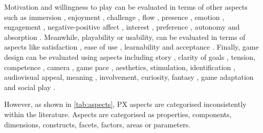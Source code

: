 Motivation and willingness to play can be evaluated in terms of other aspects such as immersion \autocite{Lapas2015,Nacke2009,VandenAbeele2016,Wiemeyer2016,Nijhar2012,Sanchez2009,Desurvire2009,Nijholt2008}, enjoyment \autocite{Ho2017,Li2016,VandenAbeele2016,Zhao2016,Li2006,Berkovsky2010}, challenge \autocite{Moosajee,Nacke2009,VandenAbeele2016,Wiemeyer2016,Desurvire2009}, flow \autocite{Lapas2015,Bernhaupt2015,Nacke2009,Wiemeyer2016,Nijholt2008}, presence \autocite{Lapas2015,Mader2012,Ho2017,Wiemeyer2016}, 
emotion \autocite{Bernhaupt2015,Sanchez2009,Wiemeyer2016}, engagement \autocite{Yanez-Gomez2017,Wiemeyer2016}, negative-positive affect \autocite{Nacke2009}, interest \autocite{VandenAbeele2016}, preference \autocite{Zhao2016}, autonomy \autocite{Wiemeyer2016,VandenAbeele2016} and 
absorption \autocite{Lapas2015}. Meanwhile, playability or usability, can be evaluated in terms of aspects like satisfaction \autocite{Yanez-Gomez2017,Zhao2016,Sanchez2009}, ease of use \autocite{Moosajee,VandenAbeele2016,Cameirao2010}, learnability \autocite{GonzalezSanchez2009,Desurvire2009} and
acceptance \autocite{Yanez-Gomez2017}. Finally, game design can be evaluated using aspects including story \autocite{Moosajee,Desurvire2009}, clarity of goals \autocite{VandenAbeele2016,Desurvire2009}, tension, competence \autocite{Wiemeyer2016,Nacke2009}, camera \autocite{Moosajee},
game pace \autocite{Moosajee,Desurvire2009}, aesthetics, stimulation, identification \autocite{Bernhaupt2015}, audiovisual appeal, meaning \autocite{VandenAbeele2016}, involvement, curiosity, fantasy \autocite{Wiemeyer2016}, game adaptation \autocite{Wiemeyer2015,Ni2014,Cameirao2010,Nijholt2008} and social play \autocite{Wiemeyer2015,Sanchez2009,Yanez-Gomez2017,Lapas2015}.

However, as shown in \autoref{tab:aspects}, \ac{PX} aspects are categorised inconsistently within the literature. Aspects are categorised as properties,  components, dimensions, constructs, facets, factors, areas or parameters.

